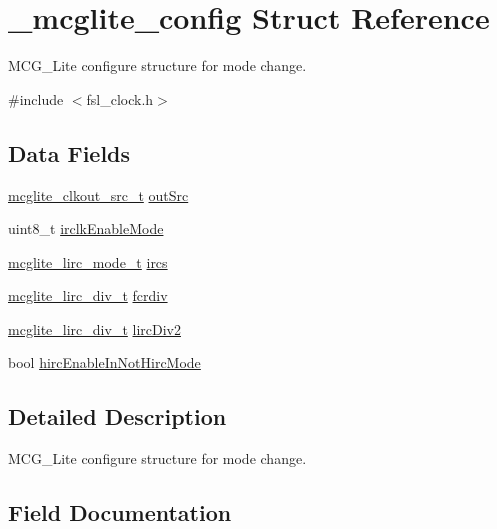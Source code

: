\hypertarget{struct__mcglite__config}{}\section{\+\_\+mcglite\+\_\+config Struct Reference}
\label{struct__mcglite__config}


M\+C\+G\+\_\+\+Lite configure structure for mode change.  




{\ttfamily \#include $<$fsl\+\_\+clock.\+h$>$}

\subsection*{Data Fields}
\begin{DoxyCompactItemize}
\item 
\mbox{\hyperlink{group__clock_ga102f26486150540dc286f6811c71d8ec}{mcglite\+\_\+clkout\+\_\+src\+\_\+t}} \mbox{\hyperlink{struct__mcglite__config_aaa8dafb0e23cd51917a168580f17b45a}{out\+Src}}
\item 
uint8\+\_\+t \mbox{\hyperlink{struct__mcglite__config_ace70be98ba5079e3e1fcd5403ff1e9f1}{irclk\+Enable\+Mode}}
\item 
\mbox{\hyperlink{group__clock_gae34f40906c4c49aa0a4fdfb00b1cc260}{mcglite\+\_\+lirc\+\_\+mode\+\_\+t}} \mbox{\hyperlink{struct__mcglite__config_a816ceb227997861614754ea401477d93}{ircs}}
\item 
\mbox{\hyperlink{group__clock_gaca07fe4bde2c34163d52f6f8507368ba}{mcglite\+\_\+lirc\+\_\+div\+\_\+t}} \mbox{\hyperlink{struct__mcglite__config_aa8400f67911439a3cd2d4693589635bd}{fcrdiv}}
\item 
\mbox{\hyperlink{group__clock_gaca07fe4bde2c34163d52f6f8507368ba}{mcglite\+\_\+lirc\+\_\+div\+\_\+t}} \mbox{\hyperlink{struct__mcglite__config_a06fa15ba0e46951aa5afc1f3b9c19d59}{lirc\+Div2}}
\item 
bool \mbox{\hyperlink{struct__mcglite__config_a9ee0c800680dc0eb71514e190f1c7e15}{hirc\+Enable\+In\+Not\+Hirc\+Mode}}
\end{DoxyCompactItemize}


\subsection{Detailed Description}
M\+C\+G\+\_\+\+Lite configure structure for mode change. 

\subsection{Field Documentation}
\mbox{\label{struct__mcglite__config_aa8400f67911439a3cd2d4693589635bd}} 
